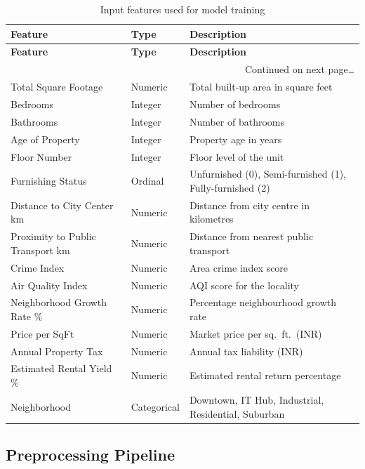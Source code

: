 \documentclass[12pt,a4paper]{article}
\begin{document}
\begin{longtable}{p{5.5cm}p{2.5cm}p{6cm}}
\caption{Input features used for model training} \\
\toprule
\textbf{Feature} & \textbf{Type} & \textbf{Description} \\
\midrule
\endfirsthead
\toprule
\textbf{Feature} & \textbf{Type} & \textbf{Description} \\
\midrule
\endhead
\midrule
\multicolumn{3}{r}{\small Continued on next page\ldots} \\
\endfoot
\bottomrule
\endlastfoot
Total Square Footage             & Numeric    & Total built-up area in square feet \\
Bedrooms                         & Integer    & Number of bedrooms \\
Bathrooms                        & Integer    & Number of bathrooms \\
Age of Property                  & Integer    & Property age in years \\
Floor Number                     & Integer    & Floor level of the unit \\
Furnishing Status                & Ordinal    & Unfurnished (0), Semi-furnished (1), Fully-furnished (2) \\
Distance to City Center km       & Numeric    & Distance from city centre in kilometres \\
Proximity to Public Transport km & Numeric    & Distance from nearest public transport \\
Crime Index                      & Numeric    & Area crime index score \\
Air Quality Index                & Numeric    & AQI score for the locality \\
Neighborhood Growth Rate \%      & Numeric    & Percentage neighbourhood growth rate \\
Price per SqFt                   & Numeric    & Market price per sq.\ ft.\ (INR) \\
Annual Property Tax              & Numeric    & Annual tax liability (INR) \\
Estimated Rental Yield \%        & Numeric    & Estimated rental return percentage \\
Neighborhood                     & Categorical & Downtown, IT Hub, Industrial, Residential, Suburban \\
\end{longtable}

\subsection{Preprocessing Pipeline}
\end{document}
